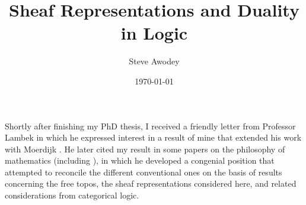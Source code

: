 \documentclass[12pt]{article}
\theoremstyle{remark}
\theoremstyle{definition}
\begin{document}

\title{
Sheaf Representations and Duality in Logic
}
\author{
Steve Awodey
}
\date{
\today}

\maketitle

%
%
%
%
%
%
%
%
%
%
%
%

%


%



\noindent Shortly after finishing my PhD thesis, I received a friendly letter from Professor Lambek in which he expressed interest in a result of mine that extended his work with Moerdijk \cite{LM}. He later cited my result in some papers on the philosophy of mathematics (including \cite{L1,L2}), in which he developed a congenial  position that attempted to reconcile the different conventional ones on the basis of results concerning the free topos, the sheaf representations considered here, and related considerations from categorical logic.    
\end{document}
